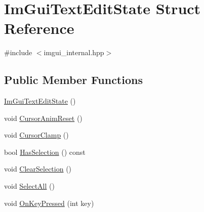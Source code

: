 \hypertarget{struct_im_gui_text_edit_state}{}\section{Im\+Gui\+Text\+Edit\+State Struct Reference}
\label{struct_im_gui_text_edit_state}


{\ttfamily \#include $<$imgui\+\_\+internal.\+hpp$>$}

\subsection*{Public Member Functions}
\begin{DoxyCompactItemize}
\item 
\hyperlink{struct_im_gui_text_edit_state_a475df87b81e95f80fa7bda77ca47d9fc}{Im\+Gui\+Text\+Edit\+State} ()
\item 
void \hyperlink{struct_im_gui_text_edit_state_abed49497339d5242f42d86193a2c683e}{Cursor\+Anim\+Reset} ()
\item 
void \hyperlink{struct_im_gui_text_edit_state_ac6f8184c63c826dfc9bc2a47ba57b80c}{Cursor\+Clamp} ()
\item 
bool \hyperlink{struct_im_gui_text_edit_state_a46735493114451380c2d3684b528d124}{Has\+Selection} () const
\item 
void \hyperlink{struct_im_gui_text_edit_state_ae753eb90c3bb7954dfc1e7fd0fef4460}{Clear\+Selection} ()
\item 
void \hyperlink{struct_im_gui_text_edit_state_ab6f494f3335bf7911b83cfc15edd612e}{Select\+All} ()
\item 
void \hyperlink{struct_im_gui_text_edit_state_a30a1d78690ef2bbb9d4b8f75385b8c26}{On\+Key\+Pressed} (int key)
\end{DoxyCompactItemize}
